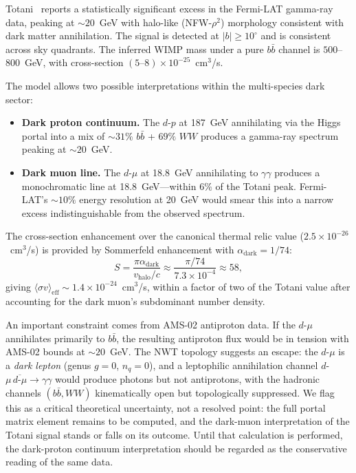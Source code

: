 \documentclass[11pt]{article}
\begin{document}
Totani~\cite{Totani2025} reports a statistically significant excess in the Fermi-LAT gamma-ray data, peaking at $\sim 20$~GeV with halo-like (NFW-$\rho^2$) morphology consistent with dark matter annihilation.
The signal is detected at $|b| \geq 10^\circ$ and is consistent across sky quadrants.
The inferred WIMP mass under a pure $b\bar{b}$ channel is $500$--$800$~GeV, with cross-section $(5\text{--}8) \times 10^{-25}$~cm$^3$/s.

The model allows two possible interpretations within the multi-species dark sector:
\begin{itemize}
\item \textbf{Dark proton continuum.} The $d$-$p$ at 187~GeV annihilating via the Higgs portal into a mix of $\sim 31\%$ $b\bar{b}$ + $69\%$ $WW$ produces a gamma-ray spectrum peaking at $\sim 20$~GeV.
\item \textbf{Dark muon line.} The $d$-$\mu$ at 18.8~GeV annihilating to $\gamma\gamma$ produces a monochromatic line at 18.8~GeV---within $6\%$ of the Totani peak.  Fermi-LAT's $\sim 10\%$ energy resolution at 20~GeV would smear this into a narrow excess indistinguishable from the observed spectrum.
\end{itemize}

The cross-section enhancement over the canonical thermal relic value ($2.5 \times 10^{-26}$~cm$^3$/s) is provided by Sommerfeld enhancement with $\alpha_\text{dark} = 1/74$:
\begin{equation}
S = \frac{\pi\alpha_\text{dark}}{v_\text{halo}/c} \approx \frac{\pi/74}{7.3 \times 10^{-4}} \approx 58,
\end{equation}
giving $\langle\sigma v\rangle_\text{eff} \sim 1.4 \times 10^{-24}$~cm$^3$/s, within a factor of two of the Totani value after accounting for the dark muon's subdominant number density.

An important constraint comes from AMS-02 antiproton data.
If the $d$-$\mu$ annihilates primarily to $b\bar{b}$, the resulting antiproton flux would be in tension with AMS-02 bounds at $\sim 20$~GeV.
The NWT topology suggests an escape: the $d$-$\mu$ is a \emph{dark lepton} (genus $g = 0$, $n_q = 0$), and a leptophilic annihilation channel $d$-$\mu\,\overline{d\text{-}\mu} \to \gamma\gamma$ would produce photons but not antiprotons, with the hadronic channels $(b\bar{b}, WW)$ kinematically open but topologically suppressed.
We flag this as a critical theoretical uncertainty, not a resolved point: the full portal matrix element remains to be computed, and the dark-muon interpretation of the Totani signal stands or falls on its outcome.
Until that calculation is performed, the dark-proton continuum interpretation should be regarded as the conservative reading of the same data.
\end{document}
